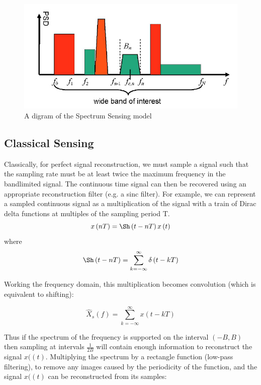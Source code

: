 \begin{figure}[h]
\centering
\includegraphics[height = 7 cm]{bands.png}
\caption{A digram of the Spectrum Sensing model \cite{Tian}}
\label{widebandspectra}
\end{figure}

\subsection{Classical Sensing}
Classically, for perfect signal reconstruction, we must sample a signal such that the sampling rate must be at least twice the maximum frequency in the bandlimited signal. The continuous time signal can then be recovered using an appropriate reconstruction filter (e.g. a sinc filter). For example, we can represent a sampled continuous signal as a multiplication of the signal with a train of Dirac delta functions at multiples of the sampling period T.
%
\begin{equation}
x\left(nT\right) = \Sh\left(t-nT\right)x\left(t\right)
\end{equation}
%
where
%
\begin{equation}
\Sh\left(t-nT\right) = \sum_{k=-\infty}^{\infty} \delta\left(t - kT\right)
\end{equation}

Working the frequency domain, this multiplication becomes convolution (which is equivalent to shifting):

\begin{equation}
\hat{X}_{s}\left(f\right) = \sum_{k=-\infty}^\infty x\left(t - kT\right)
\end{equation}

Thus if the spectrum of the frequency is supported on the interval \(\left(-B, B\right)\) then sampling at intervals \(\frac{1}{2B}\) will contain enough information to reconstruct the signal \(x(\left(t\right)\). Multiplying the spectrum by a rectangle function (low-pass filtering), to remove any images caused by the periodicity of the function, and the signal \(x(\left(t\right)\) can be reconstructed from its samples:

